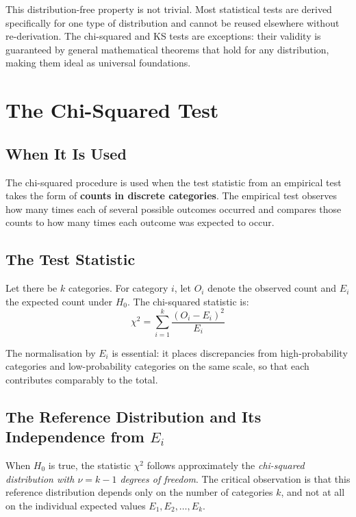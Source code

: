 \begin{important}
This distribution-free property is not trivial.  Most statistical tests are
derived specifically for one type of distribution and cannot be reused
elsewhere without re-derivation.  The chi-squared and KS tests are
exceptions: their validity is guaranteed by general mathematical theorems
that hold for any distribution, making them ideal as universal foundations.
\end{important}
 
\section{The Chi-Squared Test}\label{sec:chi-squared-test}

\subsection{When It Is Used}
 
The chi-squared procedure is used when the test statistic from an empirical
test takes the form of \textbf{counts in discrete categories}.  The
empirical test observes how many times each of several possible outcomes
occurred and compares those counts to how many times each outcome was
expected to occur.
 
\subsection{The Test Statistic}
 
Let there be $k$ categories.  For category $i$, let $O_i$ denote the
observed count and $E_i$ the expected count under $H_0$.  The chi-squared
statistic is:
\[
  \chi^2 = \sum_{i=1}^{k} \frac{(O_i - E_i)^2}{E_i}
\]
 
The normalisation by $E_i$ is essential: it places discrepancies from
high-probability categories and low-probability categories on the same
scale, so that each contributes comparably to the total.
 
\subsection{The Reference Distribution and Its Independence from $E_i$}
 
When $H_0$ is true, the statistic $\chi^2$ follows approximately the
\emph{chi-squared distribution with $\nu = k - 1$ degrees of freedom}.
The critical observation is that this reference distribution depends only
on the number of categories $k$, and not at all on the individual expected
values $E_1, E_2, \ldots, E_k$.
 
